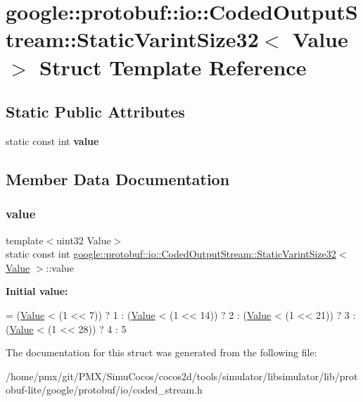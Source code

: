 \hypertarget{structgoogle_1_1protobuf_1_1io_1_1CodedOutputStream_1_1StaticVarintSize32}{}\section{google\+:\+:protobuf\+:\+:io\+:\+:Coded\+Output\+Stream\+:\+:Static\+Varint\+Size32$<$ Value $>$ Struct Template Reference}
\label{structgoogle_1_1protobuf_1_1io_1_1CodedOutputStream_1_1StaticVarintSize32}
\subsection*{Static Public Attributes}
\begin{DoxyCompactItemize}
\item 
static const int {\bfseries value}
\end{DoxyCompactItemize}


\subsection{Member Data Documentation}
\mbox{\label{structgoogle_1_1protobuf_1_1io_1_1CodedOutputStream_1_1StaticVarintSize32_ae5fee3a1cf56eb7048bd0dd0496c996b}} 
\subsubsection{\texorpdfstring{value}{value}}
{\footnotesize\ttfamily template$<$uint32 Value$>$ \\
static const int \hyperlink{structgoogle_1_1protobuf_1_1io_1_1CodedOutputStream_1_1StaticVarintSize32}{google\+::protobuf\+::io\+::\+Coded\+Output\+Stream\+::\+Static\+Varint\+Size32}$<$ \hyperlink{classValue}{Value} $>$\+::value\hspace{0.3cm}{\ttfamily [static]}}

{\bfseries Initial value\+:}
\begin{DoxyCode}
=
        (\hyperlink{classValue}{Value} < (1 << 7))
            ? 1
            : (\hyperlink{classValue}{Value} < (1 << 14))
                ? 2
                : (\hyperlink{classValue}{Value} < (1 << 21))
                    ? 3
                    : (\hyperlink{classValue}{Value} < (1 << 28))
                        ? 4
                        : 5
\end{DoxyCode}


The documentation for this struct was generated from the following file\+:\begin{DoxyCompactItemize}
\item 
/home/pmx/git/\+P\+M\+X/\+Simu\+Cocos/cocos2d/tools/simulator/libsimulator/lib/protobuf-\/lite/google/protobuf/io/coded\+\_\+stream.\+h\end{DoxyCompactItemize}
